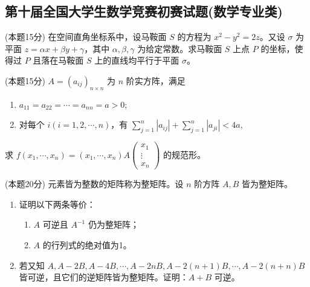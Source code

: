 \documentclass[loose]{ExBook}
\begin{document}
\subsection{第十届全国大学生数学竞赛初赛试题(数学专业类)}
\begin{qitems}
    \begin{bbox}
        \qitem (本题15分) 在空间直角坐标系中，设马鞍面 \( S \) 的方程为 \( x^2 - y^2 = 2z \)。又设 \(\sigma\) 为平面 \( z = \alpha x + \beta y + \gamma \)，其中 \(\alpha, \beta, \gamma\) 为给定常数。求马鞍面 \( S \) 上点 \( P \) 的坐标，使得过 \( P \) 且落在马鞍面 \( S \) 上的直线均平行于平面 \(\sigma\)。
    \end{bbox}

    \begin{bbox}
        \qitem (本题15分) \( A = (a_{ij})_{n \times n} \) 为 \( n \) 阶实方阵，满足
        
        \begin{enumerate}[label=(\arabic*)]
            \item \( a_{11} = a_{22} = \cdots = a_{nn} = a > 0 \);
            \item 对每个 \( i(i = 1, 2, \cdots, n) \)，有 \( \sum_{j=1}^{n} |a_{ij}| + \sum_{j=1}^{n} |a_{ji}| < 4a, \)
        \end{enumerate}
        
        求 \( f(x_1, \cdots, x_n) = (x_1, \cdots, x_n)A \begin{pmatrix} x_1 \\ \vdots \\ x_n \end{pmatrix} \) 的规范形。
    \end{bbox}

    \begin{bbox}
        \qitem (本题20分) 元素皆为整数的矩阵称为整矩阵。设 \( n \) 阶方阵 \( A, B \) 皆为整矩阵。
        
        \begin{enumerate}[label=(\arabic*)]
            \item 证明以下两条等价：
            \begin{enumerate}[label=(\roman*)]
                \item \( A \) 可逆且 \( A^{-1} \) 仍为整矩阵；
                \item \( A \) 的行列式的绝对值为1。
            \end{enumerate}
            \item 若又知 \( A, A-2B, A-4B, \cdots, A-2nB, A-2(n+1)B, \cdots, A-2(n+n)B \) 皆可逆，且它们的逆矩阵皆为整矩阵。证明：\( A+B \) 可逆。
        \end{enumerate}
    \end{bbox}


\end{qitems}
\end{document}
